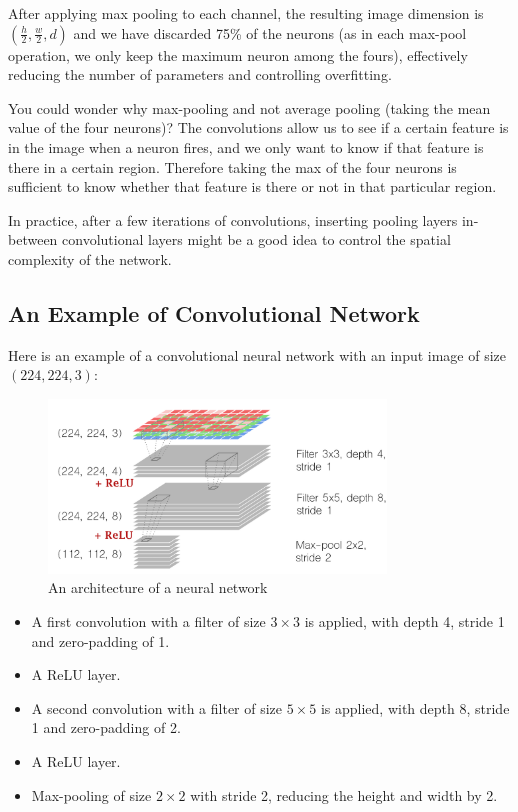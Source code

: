 After applying max pooling to each channel, the resulting image dimension is $(\frac{h}{2}, \frac{w}{2}, d)$ and we have discarded 75\% of the neurons (as in each max-pool operation, we only keep the maximum neuron among the fours), effectively reducing the number of parameters and controlling overfitting.

You could wonder why max-pooling and not average pooling (taking the mean value of the four neurons)? The convolutions allow us to see if a certain feature is in the image when a neuron fires, and we only want to know if that feature is there in a certain region. Therefore taking the max of the four neurons is sufficient to know whether that feature is there or not in that particular region.

In practice, after a few iterations of convolutions, inserting pooling layers in-between convolutional layers might be a good idea to control the spatial complexity of the network.

\subsection{An Example of Convolutional Network}
Here is an example of a convolutional neural network with an input image of size $(224, 224, 3)$:

\begin{figure}[H]
\centering
\includegraphics[width=0.8\textwidth]{Images/conv_archi.png}
\caption{An architecture of a neural network \cite{gorner}}
\end{figure}

\begin{itemize}
    \item A first convolution with a filter of size $3\times3$ is applied, with depth 4, stride 1 and zero-padding of 1.
    \item A ReLU layer.
    \item A second convolution with a filter of size $5\times5$ is applied, with depth 8, stride 1 and zero-padding of 2.
    \item A ReLU layer.
    \item Max-pooling of size $2\times2$ with stride 2, reducing the height and width by 2.
\end{itemize}

